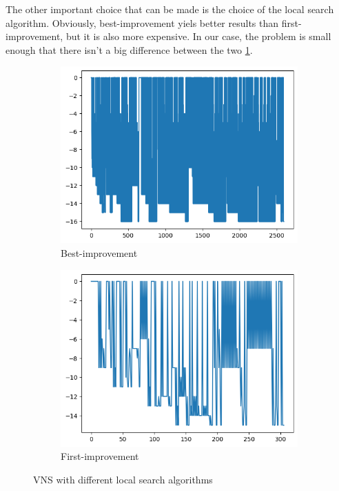 The other important choice that can be made is the choice of the local search algorithm. Obviously, best-improvement yiels better results than first-improvement, but it is also more expensive. In our case, the problem is small enough that there isn't a big difference between the two \ref{fig:vns}.
\begin{figure}[H]
    \begin{subfigure}{0.5\textwidth}
        \includegraphics[width=\textwidth]{lab4/imgs/vns_best.png}
        \caption{Best-improvement}
    \end{subfigure}
    \begin{subfigure}{0.5\textwidth}
        \includegraphics[width=\textwidth]{lab4/imgs/vns_first.png}
        \caption{First-improvement}
    \end{subfigure}
    \caption{VNS with different local search algorithms}
    \label{fig:vns}
\end{figure}


